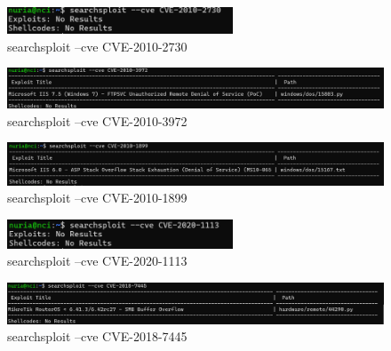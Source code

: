\documentclass[a4paper,12pt]{article} %
\begin{document}
            \begin{figure} [hp!]
             \centering
             \includegraphics[width=0.6\textwidth]{imagenes/cve10No.png}
             \caption{ searchsploit --cve CVE-2010-2730}
             \label{fig:10No}
            \end{figure}
            
            \begin{figure} [hp!]
             \centering
             \includegraphics[width=1\textwidth]{imagenes/cve1072.png}
             \caption{ searchsploit --cve CVE-2010-3972}
             \label{fig:1072}
            \end{figure}
            
            \begin{figure} [hp!]
             \centering
             \includegraphics[width=1\textwidth]{imagenes/cve1089.png}
             \caption{ searchsploit --cve  CVE-2010-1899}
             \label{fig:1089}
            \end{figure}

\newpage
            \begin{figure} [hp!]
             \centering
             \includegraphics[width=0.6\textwidth]{imagenes/cve20No.png}
             \caption{ searchsploit --cve CVE-2020-1113}
             \label{fig:20No}
            \end{figure}

            \begin{figure} [hp!]
             \centering
             \includegraphics[width=1\textwidth]{imagenes/cve1845.png}
             \caption{ searchsploit --cve CVE-2018-7445}
             \label{fig:1845}
            \end{figure}
\end{document}
